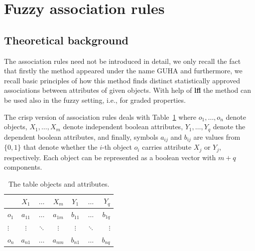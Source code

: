 \documentclass[review]{elsarticle}
\newcommand{\pkg}[1]{\textbf{#1}}
\newcommand{\code}[1]{\texttt{#1}}
\begin{document}
%
%
%





\section{Fuzzy association rules}
\label{sec:assoc}

\subsection{Theoretical background}

The association rules \citep{Agrawal:assoc_rules} need not be introduced in detail, we only recall the fact that firstly the method appeared under the name GUHA \citep{Hajek:GUHA,HajekHavranek_GUHA} and furthermore, we recall basic principles of how this method finds  distinct statistically
approved associations between attributes of given objects. With help of \pkg{lfl} the method can be used also in the fuzzy setting, i.e., for graded properties. 


The crisp version of association rules deals with
Table~\ref{Tab:guha_exampleI} where $o_1,\dots, o_n$ denote objects,
$X_1,\dots , X_m$ denote independent boolean attributes, $Y_1,
\dots, Y_q$ denote the dependent boolean attributes, and
finally, symbols $a_{ij}$ and $b_{ij}$ are values from $ \{ 0,1 \}$ that denote
whether the $i$-th object $o_i$ carries attribute $X_j$ or $Y_j$, respectively. Each object can be represented as a boolean vector with $m+q$ components.

\begin{table}[ht]
  \centering
\begin{tabular}{|l|ccc|ccr|}
    \hline
          & $X_1$ & $\ldots$ & $X_m$ & $Y_1$ &  $\ldots$ & $Y_q$\\
    \hline
    $o_1$ & $a_{11}$ & $\ldots$ & $a_{1m}$ & $b_{11}$ &  $\ldots$ & $b_{1q}$\\
    $\vdots$ & $\vdots$ & $\ddots$ & $\vdots$ & $\vdots$ & $\ddots$ & $\vdots$\\
    $o_n$ & $a_{n1}$ & $\ldots$ & $a_{nm}$ & $b_{n1}$ &  $\ldots$ & $b_{nq}$\\
    \hline
\end{tabular}\caption{The table objects and attributes.} \label{Tab:guha_exampleI}
\end{table}
\end{document}
